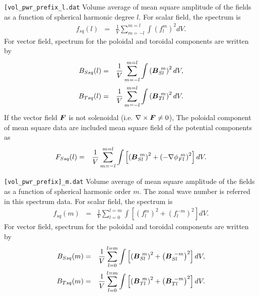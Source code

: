 \begin{description}
\item{\tt [vol\_pwr\_prefix\_l.dat}  Volume average of mean square amplitude of the fields as a function of spherical harmonic degree $l$. For scalar field, the spectrum is
%
\begin{eqnarray}
f_{sq}(l) &=& \frac{1}{V} \sum_{m=-l}^{m=l} \int \left({f_{l}^{m}} \right)^{2} dV.
\nonumber
\end{eqnarray}
%
For vector field, spectrum for the poloidal and toroidal components are written by 
%
\begin{eqnarray}
B_{Ssq}(l) &=& \frac{1}{V} \sum_{m=-l}^{m=l} \int \left(\mbox{\boldmath$B$}_{Sl}^{\ m} \right)^{2} dV,
\nonumber \\
B_{Tsq}(l) &=& \frac{1}{V} \sum_{m=-l}^{m=l} \int \left(\mbox{\boldmath$B$}_{Tl}^{\ m} \right)^{2} dV.
\end{eqnarray}
%
If the vector field $\mbox{\boldmath$F$}$ is not solenoidal (i.e. $\nabla \times \mbox{\boldmath$F$} \neq 0$), The poloidal component of mean square data are included mean square field of the potential components as
%
\begin{eqnarray}
F_{Ssq}(l) &=& \frac{1}{V} \sum_{m=-l}^{m=l} \int \left[\left(\mbox{\boldmath$B$}_{Sl}^{\ m} \right)^{2}
 + \left(-\nabla \phi_{Fl}^{\ m} \right)^{2} \right] dV.
\nonumber \\
\end{eqnarray}
%

\item{\tt [vol\_pwr\_prefix]\_m.dat} Volume average of mean square amplitude of the fields as a function of spherical harmonic order $m$. The zonal wave number is referred in this spectrum data. For scalar field, the spectrum is
\begin{eqnarray}
f_{sq}(m) &=& \frac{1}{V} \sum_{l=0}^{l=m} \int \left[ \left(f_{l}^{m} \right)^{2}
 + \left( f_{l}^{-m} \right)^{2} \right] dV.
\nonumber
\end{eqnarray}
For vector field, spectrum for the poloidal and toroidal components are written by 
\begin{eqnarray}
B_{Ssq}(m) &=& \frac{1}{V} \sum_{l=0}^{l=m} \int \left[\left(\mbox{\boldmath$B$}_{Sl}^{\ m} \right)^{2} 
 + \left(\mbox{\boldmath$B$}_{Sl}^{\ -m} \right)^{2}  \right] dV,
\nonumber \\
B_{Tsq}(m) &=& \frac{1}{V} \sum_{l=0}^{l=m} \int \left[\left(\mbox{\boldmath$B$}_{Tl}^{\ m} \right)^{2} 
 + \left(\mbox{\boldmath$B$}_{Tl}^{\ -m} \right)^{2}  \right] dV.
\nonumber
\end{eqnarray}


\end{description}
